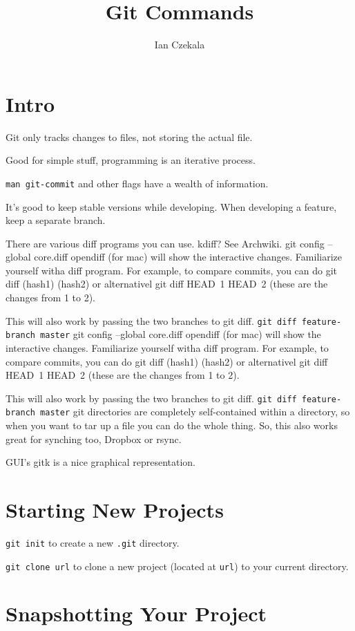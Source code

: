 \documentclass{article}
\title{Git Commands}
\author{Ian Czekala}
\begin{document}
\maketitle

\section{Intro}
Git only tracks changes to files, not storing the actual file.

Good for simple stuff, programming is an iterative process.

\verb|man git-commit| and other flags have a wealth of information.

It's good to keep stable versions while developing. When developing a feature, keep a separate branch.

There are various diff programs you can use. kdiff? See Archwiki.
git config --global core.diff opendiff (for mac) will show the interactive changes. Familiarize yourself witha diff program. For example, to compare commits, you can do git diff (hash1) (hash2) or alternativel git diff HEAD~1 HEAD~2 (these are the changes from 1 to 2).

This will also work by passing the two branches to git diff. \verb|git diff feature-branch master|
git config --global core.diff opendiff (for mac) will show the interactive changes. Familiarize yourself witha diff program. For example, to compare commits, you can do git diff (hash1) (hash2) or alternativel git diff HEAD~1 HEAD~2 (these are the changes from 1 to 2).

This will also work by passing the two branches to git diff. \verb|git diff feature-branch master|
git directories are completely self-contained within a directory, so when you want to tar up a file you can do the whole thing. So, this also works great for synching too, Dropbox or rsync.

GUI's gitk is a nice graphical representation. 

\section{Starting New Projects}

\verb|git init| to create a new \verb|.git| directory.

\verb|git clone url| to clone a new project (located at \verb|url|) to your
current directory.

\section{Snapshotting Your Project}
\end{document}
